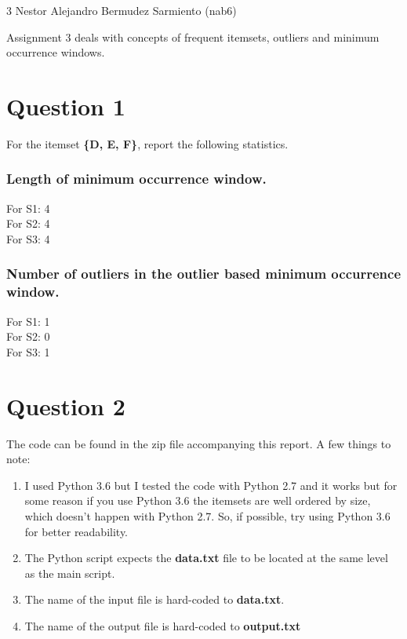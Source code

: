\documentclass[11pt]{article}
\begin{document}
\homework
    {3}
    {Nestor Alejandro Bermudez Sarmiento (nab6)}
    {}

Assignment 3 deals with concepts of  frequent itemsets, outliers and minimum occurrence windows. 

\section*{Question 1}
For the itemset \textbf{\{D, E, F\}}, report the following statistics.

\subsubsection*{Length of minimum occurrence window.}
For S1: 4\\
For S2: 4\\
For S3: 4

\subsubsection*{Number of outliers in the outlier based minimum occurrence window.}
For S1: 1\\
For S2: 0\\
For S3: 1

\section*{Question 2}
The code can be found in the zip file accompanying this report. A few things to note:

\begin{enumerate}
\item I used Python 3.6 but I tested the code with Python 2.7 and it works but for some reason if you use Python 3.6 the itemsets are well ordered by size, which doesn't happen with Python 2.7. So, if possible, try using Python 3.6 for better readability.
\item The Python script expects the \textbf{data.txt} file to be located at the same level as the main script.
\item The name of the input file is hard-coded to \textbf{data.txt}.
\item The name of the output file is hard-coded to \textbf{output.txt}
\end{enumerate}
\end{document}
